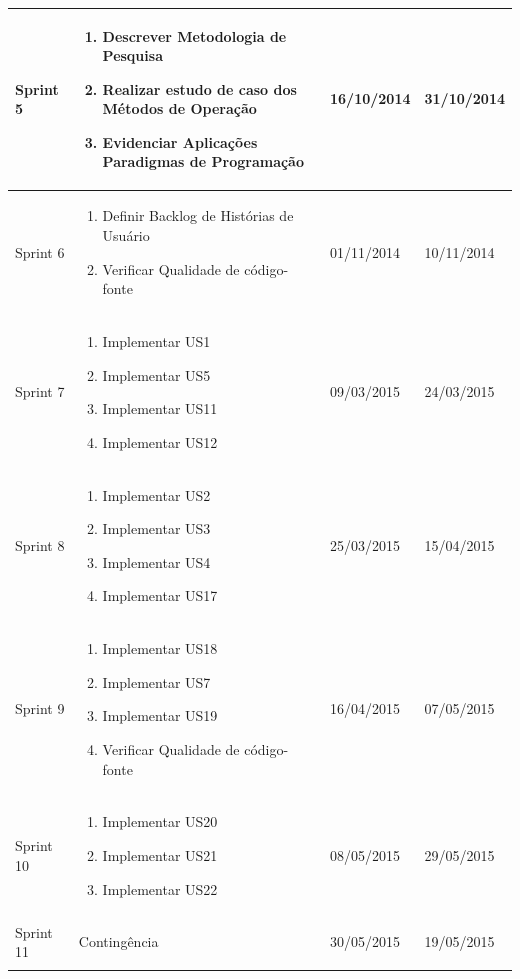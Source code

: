 \begin{center}
\begin{longtable}{  | p{2cm} | p{8cm} | p{2cm}| p{2cm} |}
    Sprint 5 & \begin{enumerate}
    \item Descrever Metodologia de Pesquisa
    \item Realizar estudo de caso dos  Métodos de Operação
    \item Evidenciar Aplicações Paradigmas de Programação
    \end{enumerate} & 16/10/2014 & 31/10/2014\\ \hline
    
    Sprint 6 & \begin{enumerate}
    \item Definir Backlog de Histórias de Usuário
    \item Verificar Qualidade de código-fonte
    \end{enumerate} & 01/11/2014 & 10/11/2014\\ \hline

    Sprint 7 & \begin{enumerate}
    \item Implementar US1
    \item Implementar US5
    \item Implementar US11
    \item Implementar US12
    \end{enumerate} & 09/03/2015 & 24/03/2015\\ \hline

    Sprint 8 & \begin{enumerate}
    \item Implementar US2
    \item Implementar US3
    \item Implementar US4
    \item Implementar US17
    \end{enumerate} & 25/03/2015 & 15/04/2015\\ \hline

    Sprint 9 & \begin{enumerate}
    \item Implementar US18
    \item Implementar US7
    \item Implementar US19
    \item Verificar Qualidade de código-fonte
    \end{enumerate} & 16/04/2015 & 07/05/2015\\ \hline

    Sprint 10 & \begin{enumerate}
    \item Implementar US20
    \item Implementar US21
    \item Implementar US22
    \end{enumerate} & 08/05/2015 & 29/05/2015\\ \hline

    Sprint 11 & Contingência & 30/05/2015 & 19/05/2015

\label{cronograma}
\end{longtable}
\end{center}

